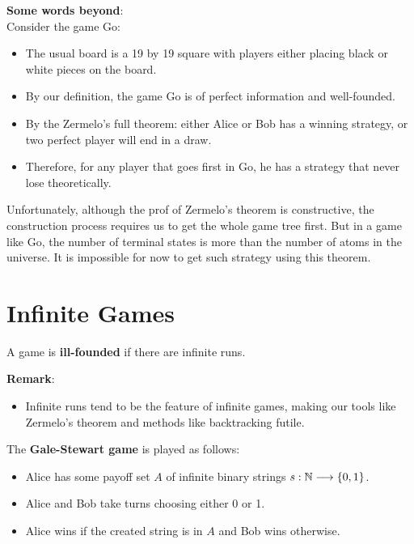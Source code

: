 \noindent \textbf{Some words beyond}:\\
Consider the game Go:
\begin{itemize}
    \item The usual board is a 19 by 19 square with players either placing black or white pieces on the board.
    \item By our definition, the game Go is of perfect information and well-founded.
    \item By the Zermelo's full theorem: either Alice or Bob has a winning strategy, or two perfect player will end in a draw.
    \item Therefore, for any player that goes first in Go, he has a strategy that never lose theoretically.
\end{itemize}
Unfortunately, although the prof of Zermelo's theorem is constructive, the construction process requires us to get the whole game tree first. 
But in a game like Go, the number of terminal states is more than the number of atoms in the universe. It is impossible for now to get such strategy using this theorem.



\section{Infinite Games}

\begin{definition}
    A game is \textbf{ill-founded} if there are infinite runs.
\end{definition}
\textbf{Remark}:
\begin{itemize}
    \item Infinite runs tend to be the feature of infinite games, making our tools like Zermelo's theorem and methods like backtracking futile.
\end{itemize}


\begin{definition}
    The \textbf{Gale-Stewart game} is played as follows:
    \begin{itemize}
        \item Alice has some payoff set $A$ of infinite binary strings $s:\mathbb{N} \longrightarrow \{0,1\}$.
        \item Alice and Bob take turns choosing either 0 or 1.
        \item Alice wins if the created string is in $A$ and Bob wins otherwise.
    \end{itemize}
\end{definition}

